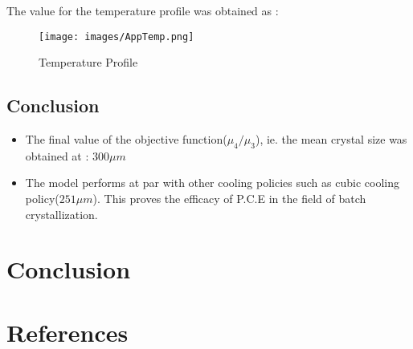 \documentclass[3p,times,authoryear]{elsarticle}
\begin{document}
The value for the temperature profile was obtained as :
\begin{figure}[h!] 
\begin{center}
\texttt{[image: images/AppTemp.png]}
\end{center}
\caption{Temperature Profile}
\end{figure}

\subsection{Conclusion}

\begin{itemize}
\item The final value of the objective function($\mu_{4}/\mu_{3}$), ie. the mean crystal size was obtained at : $300 \mu m$
\item The model performs at par with other cooling policies such as cubic cooling policy($251 \mu m$)\cite{bhoi}. This proves the efficacy of P.C.E in the field of batch crystallization.
\end{itemize}


\section{Conclusion}








\clearpage
\section{References}



%

	

\end{document}
